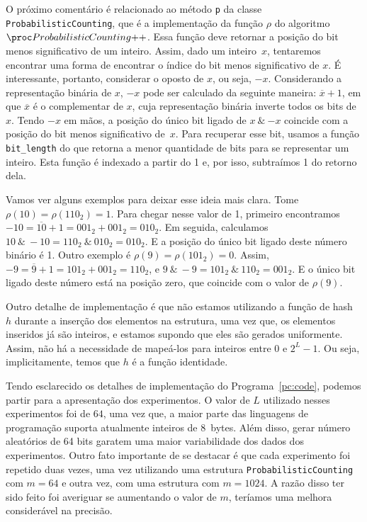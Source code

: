 O próximo comentário é relacionado ao método \texttt{p} da classe \texttt{ProbabilisticCounting}, que é a implementação 
da função $\rho$ do algoritmo~$\pcpp$. Essa função deve retornar a posição do bit menos significativo de um inteiro. 
Assim, dado um inteiro~$x$, tentaremos encontrar uma forma de encontrar o índice do bit menos significativo de $x$. É 
interessante, portanto, considerar o oposto de $x$, ou seja, $-x$. Considerando a representação binária de $x$, $-x$ 
pode ser calculado da seguinte maneira: $\overline{x} + 1$, em que $\overline{x}$ é o complementar de $x$, cuja 
representação binária inverte todos os bits de $x$. Tendo $-x$ em mãos, a posição do único bit ligado de 
$x \ {\&} \ {-x}$ coincide com a posição do bit menos significativo de~$x$. Para recuperar esse bit, usamos a função 
\texttt{bit\_length} do  que retorna a menor quantidade de bits para se representar um inteiro. Esta função 
é indexado a partir do 1 e, por isso, subtraímos 1 do retorno dela. 

Vamos ver alguns exemplos para deixar esse ideia mais clara. Tome $\rho(10) = \rho(110_2) = 1$. Para chegar nesse valor 
de 1, primeiro encontramos $-10 = \overline{10} + 1 = 001_2 + 001_2 = 010_2$. Em seguida, calculamos
$10 \ {\&} \ -10 = 110_2 \ {\&} \ 010_2 = 010_2$. E a posição do único bit ligado deste número binário é 1. Outro 
exemplo é $\rho(9) = \rho(101_2) = 0$. Assim, $-9 = \overline{9} + 1 = 101_2 + 001_2 = 110_2$, e 
$9 \ {\&} \ -9 = 101_2 \ {\&} \ 110_2 = 001_2$. E o único bit ligado deste número está na posição zero, que coincide com
o valor de $\rho(9)$.

Outro detalhe de implementação é que não estamos utilizando a função de hash~$h$ durante a inserção dos elementos na 
estrutura, uma vez que, os elementos inseridos já são inteiros, e estamos supondo que eles são gerados uniformente. 
Assim, não há a necessidade de mapeá-los para inteiros entre $0$ e $2^{L} - 1$. Ou seja, implicitamente, temos que $h$ é 
a função identidade.

Tendo esclarecido os detalhes de implementação do Programa~\ref{pc:code}, podemos partir para a apresentação dos 
experimentos. O valor de $L$ utilizado nesses experimentos foi de $64$, uma vez que, a maior parte das linguagens de 
programação suporta atualmente inteiros de $8$~bytes. Além disso, gerar número aleatórios de 64 bits garatem uma maior
variabilidade dos dados dos experimentos. Outro fato importante de se destacar é que cada experimento foi repetido duas 
vezes, uma vez utilizando uma estrutura \texttt{ProbabilisticCounting} com $m = 64$ e outra vez, com uma estrutura com 
$m = 1024$. A razão disso ter sido feito foi averiguar se aumentando o valor de $m$, teríamos uma melhora considerável 
na precisão.

